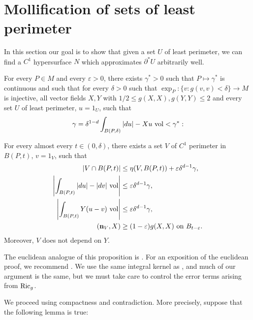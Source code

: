 \section{Mollification of sets of least perimeter}\label{MollifierSection}
In this section our goal is to show that given a set $U$ of least perimeter, we can find a $C^1$ hypersurface $N$ which approximates $\partial^* U$ arbitrarily well.

\begin{proposition}\label{mollifier quant}
    For every $P \in M$ and every $\varepsilon > 0$, there exists $\gamma^* > 0$ such that $P \mapsto \gamma^*$ is continuous and such that for every $\delta > 0$ such that $\exp_P: \{v: g(v, v) < \delta\} \to M$ is injective, all vector fields $X, Y$ with $1/2 \leq g(X, X), g(Y, Y) \leq 2$ and every set $U$ of least perimeter, $u = 1_U$, such that
    \begin{equation}\label{bootstrap the mollifier}
    \gamma = \delta^{1 - d}\int_{B(P, \delta)} |du| - Xu ~\mathrm{vol} < \gamma^*:
    \end{equation}

    For every almost every $t \in (0, \delta)$, there exists a set $V$ of $C^1$ perimeter in $B(P, t)$, $v = 1_V$, such that
    \begin{align}
    |V \cap B(P, t)| &\leq \eta(V, B(P, t)) + \varepsilon \delta^{d - 1} \gamma, \label{mollifier quant1}\\
    \left|\int_{B(P, t)} |du| - |dv| ~\mathrm{vol}\right| &\leq \varepsilon \delta^{d - 1} \gamma, \label{mollifier quant2}\\
    \left|\int_{B(P, t)} Y(u - v) ~\mathrm{vol}\right| &\leq \varepsilon \delta^{d - 1} \gamma, \label{mollifier quant3}\\
    (\mathbf n_V, X) &\geq (1 - \varepsilon) g(X, X) \text{ on } B_{t-\varepsilon}. \label{mollifier quant4}
    \end{align}
    Moreover, $V$ does not depend on $Y$.
\end{proposition}

The euclidean analogue of this proposition is \cite[Lemma 5.5]{Miranda66}.
For an exposition of the euclidean proof, we recommend \cite[Chapter 7]{Giusti77}.
We use the same integral kernel as \cite[Chapter 7]{Giusti77}, and much of our argument is the same, but we must take care to control the error terms arising from $\mathrm{Ric}_g$.

We proceed using compactness and contradiction. More precisely, suppose that the following lemma is true:

